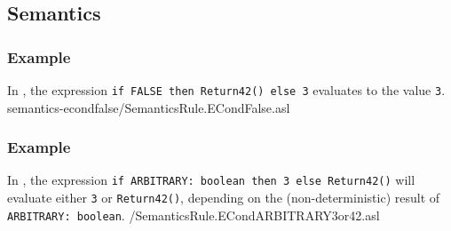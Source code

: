\subsection{Semantics}
\subsubsection{Example}
In ,
the expression \texttt{if FALSE then Return42() else 3} evaluates to the value \texttt{3}.
{semantics-econdfalse}{\semanticstests/SemanticsRule.ECondFalse.asl}

\subsubsection{Example}
In ,
the expression \texttt{if ARBITRARY: boolean then 3 else Return42()} will
evaluate either \texttt{3} or \texttt{Return42()}, depending on the
(non-deterministic) result of \\
\texttt{ARBITRARY: boolean}.
{\semanticstests/SemanticsRule.ECondARBITRARY3or42.asl}


